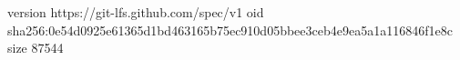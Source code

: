 version https://git-lfs.github.com/spec/v1
oid sha256:0e54d0925e61365d1bd463165b75ec910d05bbee3ceb4e9ea5a1a116846f1e8c
size 87544
